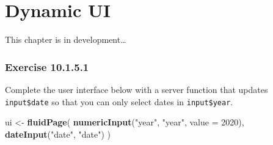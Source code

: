 \documentclass[]{book}
\newenvironment{Shaded}{\begin{snugshade}}{\end{snugshade}}
\newcommand{\ControlFlowTok}[1]{\textcolor[rgb]{0.13,0.29,0.53}{\textbf{#1}}}
\newcommand{\DataTypeTok}[1]{\textcolor[rgb]{0.13,0.29,0.53}{#1}}
\newcommand{\DecValTok}[1]{\textcolor[rgb]{0.00,0.00,0.81}{#1}}
\newcommand{\KeywordTok}[1]{\textcolor[rgb]{0.13,0.29,0.53}{\textbf{#1}}}
\newcommand{\NormalTok}[1]{#1}
\newcommand{\OperatorTok}[1]{\textcolor[rgb]{0.81,0.36,0.00}{\textbf{#1}}}
\newcommand{\StringTok}[1]{\textcolor[rgb]{0.31,0.60,0.02}{#1}}
\begin{document}
\begin{solution}
\begin{Shaded}
\end{Shaded}

\end{solution}

\hypertarget{dynamic-ui}{%
\chapter{Dynamic UI}\label{dynamic-ui}}

\begin{TODO}

This chapter is in development\ldots{}

\end{TODO}

\hypertarget{exercise-10.1.5.1}{%
\subsection*{Exercise 10.1.5.1}\label{exercise-10.1.5.1}}

Complete the user interface below with a server function that updates \texttt{input\$date} so that you can only select dates in \texttt{input\$year}.

\begin{Shaded}
\begin{Highlighting}[]
\NormalTok{ui <-}\StringTok{ }\KeywordTok{fluidPage}\NormalTok{(}
  \KeywordTok{numericInput}\NormalTok{(}\StringTok{"year"}\NormalTok{, }\StringTok{"year"}\NormalTok{, }\DataTypeTok{value =} \DecValTok{2020}\NormalTok{),}
  \KeywordTok{dateInput}\NormalTok{(}\StringTok{"date"}\NormalTok{, }\StringTok{"date"}\NormalTok{)}
\NormalTok{)}
\end{Highlighting}
\end{Shaded}
\end{document}
